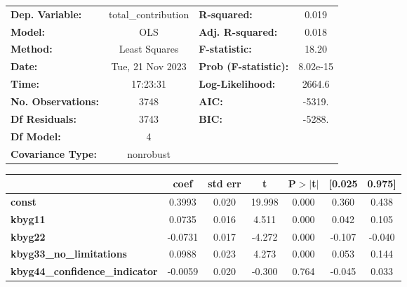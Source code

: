 \begin{center}
\begin{tabular}{lclc}
\toprule
\textbf{Dep. Variable:}                & total\_contribution & \textbf{  R-squared:         } &     0.019   \\
\textbf{Model:}                        &         OLS         & \textbf{  Adj. R-squared:    } &     0.018   \\
\textbf{Method:}                       &    Least Squares    & \textbf{  F-statistic:       } &     18.20   \\
\textbf{Date:}                         &   Tue, 21 Nov 2023  & \textbf{  Prob (F-statistic):} &  8.02e-15   \\
\textbf{Time:}                         &       17:23:31      & \textbf{  Log-Likelihood:    } &    2664.6   \\
\textbf{No. Observations:}             &          3748       & \textbf{  AIC:               } &    -5319.   \\
\textbf{Df Residuals:}                 &          3743       & \textbf{  BIC:               } &    -5288.   \\
\textbf{Df Model:}                     &             4       & \textbf{                     } &             \\
\textbf{Covariance Type:}              &      nonrobust      & \textbf{                     } &             \\
\bottomrule
\end{tabular}
\begin{tabular}{lcccccc}
                                       & \textbf{coef} & \textbf{std err} & \textbf{t} & \textbf{P$> |$t$|$} & \textbf{[0.025} & \textbf{0.975]}  \\
\midrule
\textbf{const}                         &       0.3993  &        0.020     &    19.998  &         0.000        &        0.360    &        0.438     \\
\textbf{kbyg11}                        &       0.0735  &        0.016     &     4.511  &         0.000        &        0.042    &        0.105     \\
\textbf{kbyg22}                        &      -0.0731  &        0.017     &    -4.272  &         0.000        &       -0.107    &       -0.040     \\
\textbf{kbyg33\_no\_limitations}       &       0.0988  &        0.023     &     4.273  &         0.000        &        0.053    &        0.144     \\
\textbf{kbyg44\_confidence\_indicator} &      -0.0059  &        0.020     &    -0.300  &         0.764        &       -0.045    &        0.033     \\

\end{tabular}
\end{center}
